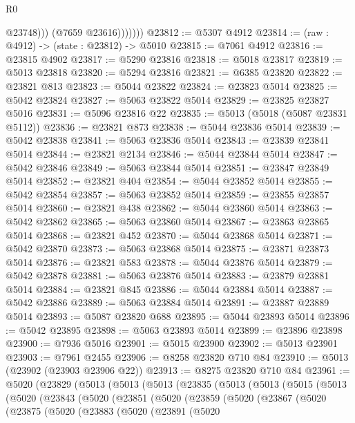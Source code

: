 \begin{lexlean}{R0}
\begin{coremodule}
                      @23748)))
                (@7659 @23616)))))))
@23812 := @5307 @4912
@23814 := (raw : @4912) -> (state : @23812) -> @5010
@23815 := @7061 @4912
@23816 := @23815 @4902
@23817 := @5290 @23816
@23818 := @5018 @23817
@23819 := @5013 @23818
@23820 := @5294 @23816
@23821 := @6385 @23820
@23822 := @23821 @813
@23823 := @5044 @23822
@23824 := @23823 @5014
@23825 := @5042 @23824
@23827 := @5063 @23822 @5014
@23829 := @23825 @23827 @5016
@23831 := @5096 @23816 @22
@23835 := @5013 (@5018 (@5087 @23831 @5112))
@23836 := @23821 @873
@23838 := @5044 @23836 @5014
@23839 := @5042 @23838
@23841 := @5063 @23836 @5014
@23843 := @23839 @23841 @5014
@23844 := @23821 @2134
@23846 := @5044 @23844 @5014
@23847 := @5042 @23846
@23849 := @5063 @23844 @5014
@23851 := @23847 @23849 @5014
@23852 := @23821 @404
@23854 := @5044 @23852 @5014
@23855 := @5042 @23854
@23857 := @5063 @23852 @5014
@23859 := @23855 @23857 @5014
@23860 := @23821 @438
@23862 := @5044 @23860 @5014
@23863 := @5042 @23862
@23865 := @5063 @23860 @5014
@23867 := @23863 @23865 @5014
@23868 := @23821 @452
@23870 := @5044 @23868 @5014
@23871 := @5042 @23870
@23873 := @5063 @23868 @5014
@23875 := @23871 @23873 @5014
@23876 := @23821 @583
@23878 := @5044 @23876 @5014
@23879 := @5042 @23878
@23881 := @5063 @23876 @5014
@23883 := @23879 @23881 @5014
@23884 := @23821 @845
@23886 := @5044 @23884 @5014
@23887 := @5042 @23886
@23889 := @5063 @23884 @5014
@23891 := @23887 @23889 @5014
@23893 := @5087 @23820 @688
@23895 := @5044 @23893 @5014
@23896 := @5042 @23895
@23898 := @5063 @23893 @5014
@23899 := @23896 @23898
@23900 := @7936 @5016
@23901 := @5015 @23900
@23902 := @5013 @23901
@23903 := @7961 @2455
@23906 := @8258 @23820 @710 @84
@23910 := @5013 (@23902 (@23903 @23906 @22))
@23913 := @8275 @23820 @710 @84
@23961 := @5020
    (@23829
      (@5013
        (@5013
          (@5013
            (@23835
              (@5013
                (@5013
                  (@5015
                    (@5013
                      (@5020
                        (@23843
                          (@5020
                            (@23851
                              (@5020
                                (@23859
                                  (@5020
                                    (@23867
                                      (@5020
                                        (@23875
                                          (@5020
                                            (@23883
                                              (@5020
                                                (@23891
                                                  (@5020

\end{coremodule}
\end{lexlean}
